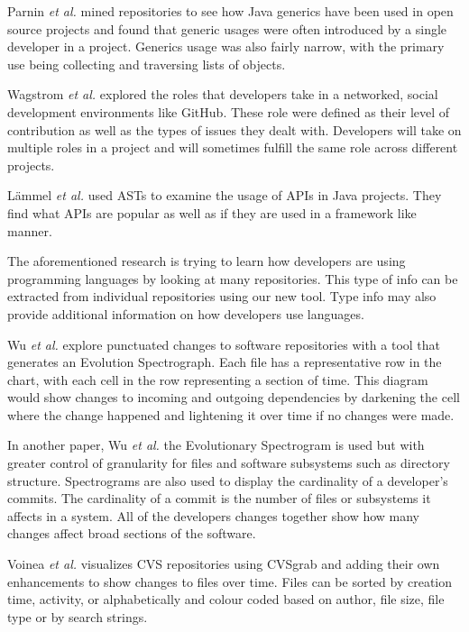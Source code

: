 \documentclass[conference]{IEEEtran}
\begin{document}
Parnin \textit{et al.} \cite{Parnin:2011:JGA:1985441.1985446} mined repositories to see how Java generics have been used in open source projects and found that generic usages were often introduced by a single developer in a project. Generics usage was also fairly narrow, with the primary use being collecting and traversing lists of objects.

Wagstrom \textit{et al.} \cite{Patrick:Wagstrom:2012} explored the roles that developers take in a networked, social development environments like GitHub. These role were defined as their level of contribution as well as the types of issues they dealt with. Developers will take on multiple roles in a project and will sometimes fulfill the same role across different projects.

L\"{a}mmel \textit{et al.} \cite{Lammel:2011:LAA:1982185.1982471} used ASTs to examine the usage of APIs in Java projects. They find what APIs are popular as well as if they are used in a framework like manner.

The aforementioned research is trying to learn how developers are using programming languages by looking at many repositories. This type of info can be extracted from individual repositories using our new tool. Type info may also provide additional information on how developers use languages.

Wu \textit{et al.} \cite{wu2004a} explore punctuated changes to software repositories with a tool that generates an Evolution Spectrograph. Each file has a representative row in the chart, with each cell in the row representing a section of time. This diagram would show changes to incoming and outgoing dependencies by darkening the cell where the change happened and lightening it over time if no changes were made.

In another paper, Wu \textit{et al.} \cite{wu2004} the Evolutionary Spectrogram is used but with greater control of granularity for files and software subsystems such as directory structure. Spectrograms are also used to display the cardinality of a developer’s commits. The cardinality of a commit is the number of files or subsystems it affects in a system. All of the developers changes together show how many changes affect broad sections of the software.

Voinea \textit{et al.} \cite{voinea2006} visualizes CVS repositories using CVSgrab and adding their own enhancements to show changes to files over time. Files can be sorted by creation time, activity, or alphabetically and colour coded based on author, file size, file type or by search strings.
\end{document}
